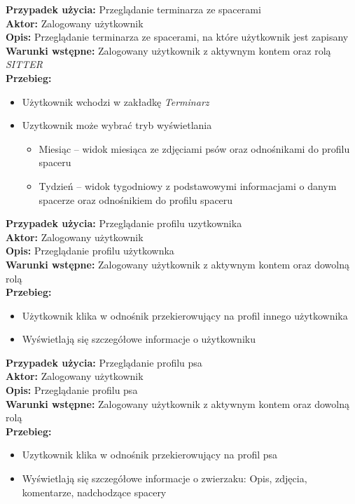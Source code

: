 \noindent
\textbf{Przypadek użycia:} Przeglądanie terminarza ze spacerami\\
\textbf{Aktor:} Zalogowany użytkownik\\
\textbf{Opis:} Przeglądanie terminarza ze spacerami, na które użytkownik jest zapisany\\
\textbf{Warunki wstępne:} Zalogowany użytkownik z aktywnym kontem oraz rolą \textit{SITTER}\\
\textbf{Przebieg:}
\begin{itemize}
    \item Użytkownik wchodzi w zakładkę \textit{Terminarz}
    \item Uzytkownik może wybrać tryb wyświetlania
    \begin{itemize}
        \item Miesiąc -- widok miesiąca ze zdjęciami psów oraz odnośnikami do profilu spaceru
        \item Tydzień -- widok tygodniowy z podstawowymi informacjami o danym spacerze oraz odnośnikiem do profilu spaceru
    \end{itemize}
\end{itemize}

\noindent
\textbf{Przypadek użycia:} Przeglądanie profilu uzytkownika\\
\textbf{Aktor:} Zalogowany użytkownik\\
\textbf{Opis:} Przeglądanie profilu użytkownka\\
\textbf{Warunki wstępne:} Zalogowany użytkownik z aktywnym kontem oraz dowolną rolą\\
\textbf{Przebieg:}
\begin{itemize}
    \item Użytkownik klika w odnośnik przekierowujący na profil innego użytkownika
    \item Wyświetlają się szczegółowe informacje o użytkowniku
\end{itemize}

\noindent
\textbf{Przypadek użycia:} Przeglądanie profilu psa\\
\textbf{Aktor:} Zalogowany użytkownik\\
\textbf{Opis:} Przeglądanie profilu psa\\
\textbf{Warunki wstępne:} Zalogowany użytkownik z aktywnym kontem oraz dowolną rolą\\
\textbf{Przebieg:}
\begin{itemize}
    \item Uzytkownik klika w odnośnik przekierowujący na profil psa
    \item Wyświetlają się szczegółowe informacje o zwierzaku: Opis, zdjęcia, komentarze, nadchodzące spacery
\end{itemize}

